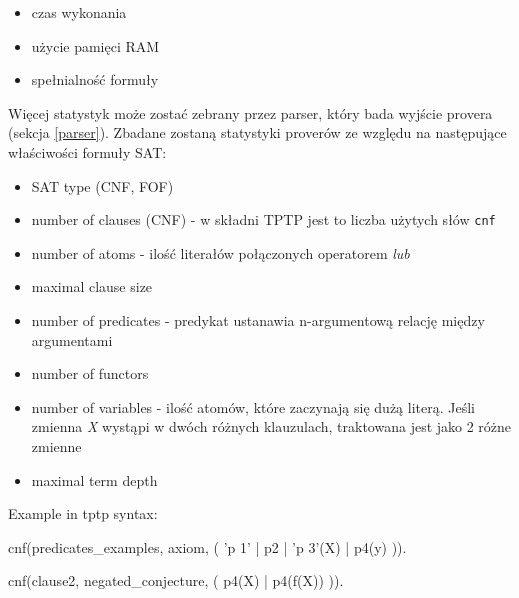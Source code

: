 \documentclass[a4paper,12pt]{article}
\begin{document}
\begin{itemize}
  \item czas wykonania
  \item użycie pamięci RAM
  \item spełnialność formuły
\end{itemize}

\noindent
Więcej statystyk może zostać zebrany przez parser, który bada wyjście provera (sekcja \ref{parser}).
\newline
Zbadane zostaną statystyki proverów ze względu na następujące właściwości formuły SAT:

\begin{itemize}
  \item SAT type (CNF, FOF)
  \item number of clauses (CNF) - w składni TPTP jest to liczba użytych słów \texttt{cnf}
  \item number of atoms - ilość literałów połączonych operatorem \textit{lub}
  \item maximal clause size
  \item number of predicates - predykat ustanawia n-argumentową relację między argumentami
  \item number of functors
  \item number of variables - ilość atomów, które zaczynają się dużą literą. Jeśli zmienna \textit{X} wystąpi w dwóch różnych klauzulach, traktowana jest jako 2 różne zmienne
  \item maximal term depth
\end{itemize}

Example in tptp syntax:

\begin{tptpcode}

cnf(predicates_examples, axiom,
  ( 'p 1' %
  | p2
  | 'p 3'(X) %
  | p4(y) %
  )).

cnf(clause2, negated_conjecture,
    ( p4(X)
    | p4(f(X)) %
    )).

\end{tptpcode}
\end{document}
